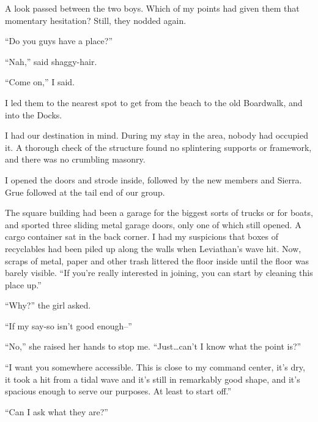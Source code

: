 A look passed between the two boys.  Which of my points had given them that momentary hesitation?  Still, they nodded again.



``Do you guys have a place?''



``Nah,'' said shaggy-hair.



``Come on,'' I said.



I led them to the nearest spot to get from the beach to the old Boardwalk, and into the Docks.



I had our destination in mind.  During my stay in the area, nobody had occupied it.  A thorough check of the structure found no splintering supports or framework, and there was no crumbling masonry.



I opened the doors and strode inside, followed by the new members and Sierra.  Grue followed at the tail end of our group.



The square building had been a garage for the biggest sorts of trucks or for boats, and sported three sliding metal garage doors, only one of which still opened.  A cargo container sat in the back corner.  I had my suspicions that boxes of recyclables had been piled up along the walls when Leviathan's wave hit.  Now, scraps of metal, paper and other trash littered the floor inside until the floor was barely visible.  ``If you're really interested in joining, you can start by cleaning this place up.''



``Why?'' the girl asked.



``If my say-so isn't good enough--''



``No,'' she raised her hands to stop me.  ``Just\ldots can't I know what the point is?''



``I want you somewhere accessible.  This is close to my command center, it's dry, it took a hit from a tidal wave and it's still in remarkably good shape, and it's spacious enough to serve our purposes.  At least to start off.''



``Can I ask what they are?''




